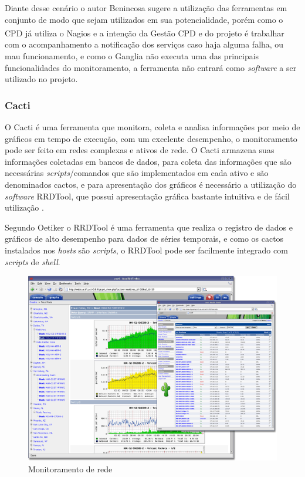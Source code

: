  Diante desse cenário o autor Benincosa \cite{benincosa2ganglia} sugere a utilização das ferramentas em conjunto de modo que sejam utilizados em sua potencialidade, porém como o \acrshort{CPD} já utiliza o Nagios\textsuperscript{\textregistered} e a intenção da Gestão \acrshort{CPD} e do projeto é trabalhar com o acompanhamento a notificação dos serviços caso haja alguma falha, ou mau funcionamento, e como o Ganglia não executa uma das principais funcionalidades do monitoramento, a ferramenta não entrará como \textit{software} a ser utilizado no projeto.
 

\subsubsection{Cacti}

O Cacti é uma ferramenta que monitora, coleta e analisa informações por meio de gráficos em tempo de execução, com um excelente desempenho, o monitoramento pode ser feito em redes complexas e ativos de rede. O Cacti armazena suas informações coletadas em bancos de dados, para coleta das informações que são necessárias \textit{scripts}/comandos que são implementados em cada ativo e são denominados cactos, e para apresentação dos gráficos é necessário a utilização do \textit{software}  \acrfull{RRDTool}, que possui apresentação gráfica bastante intuitiva e de fácil utilização \cite{cacti}.

Segundo Oetiker\cite{rrdtool} o \acrshort{RRDTool} é uma ferramenta que realiza o registro de dados e gráficos de alto desempenho para dados de séries temporais, e como os cactos instalados nos \textit{hosts} são \textit{scripts}, o \acrshort{RRDTool} pode ser facilmente integrado com \textit{scripts} de \textit{shell}. 

\begin{figure}[H]
	\begin{center}
	\includegraphics[scale = 0.50]{img/cacti_promo_main.png}
		\caption{Monitoramento de rede \cite{cacti}}
		\label{fun:fig:cacti}
	\end{center}
\end{figure}

